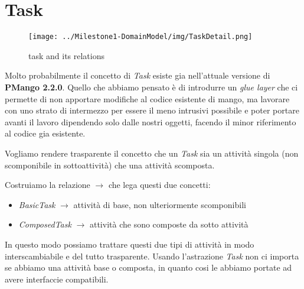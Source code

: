 \section{Task}
\label{sec:task}

\begin{figure}[h!] 
	\centering
	\texttt{[image: ../Milestone1-DomainModel/img/TaskDetail.png]}
	\caption{task and its relations}
	\label{fig:task} 
\end{figure}

Molto probabilmente il concetto di \emph{Task} esiste gia nell'attuale
versione di \textbf{PMango 2.2.0}. Quello che abbiamo pensato \`e di introdurre
un \emph{glue layer} che ci permette di non apportare modifiche al codice
esistente di mango, ma lavorare con uno strato di intermezzo per essere il meno
intrusivi possibile e poter portare avanti il lavoro dipendendo solo dalle
nostri oggetti, facendo il minor riferimento al codice gia esistente.

Vogliamo rendere trasparente il concetto che un \emph{Task} sia un attivit\`a
singola (non scomponibile in sottoattivit\`a) che una attivit\`a scomposta. 

Costruiamo la relazione $\rightarrow$ che lega questi due concetti:
\begin{itemize}
  \item \emph{BasicTask} $\rightarrow$ attivit\`a di base, non ulteriormente
  scomponibili
  \item \emph{ComposedTask} $\rightarrow$ attivit\`a che sono composte da sotto
  attivit\`a
\end{itemize}
In questo modo possiamo trattare questi due tipi di attivit\`a in modo
interscambiabile e del tutto trasparente. Usando l'astrazione \emph{Task} non
ci importa se abbiamo una attivit\`a base o composta, in quanto cosi le abbiamo
portate ad avere interfaccie compatibili.
